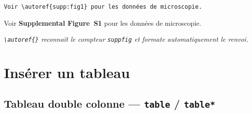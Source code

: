 \documentclass[12pt, a4paper]{article}
\begin{document}
\begin{demo}
\begin{lstlisting}[style=latexcode]
% Dans le corps du texte :
Voir \autoref{supp:fig1} pour les données de microscopie.
\end{lstlisting}
\tcblower
{\footnotesize Voir \textcolor{ENSorange}{\textbf{Supplemental Figure~S1}} pour les données de microscopie.\medskip

\textit{\texttt{\textbackslash autoref\{\}} reconnaît le compteur \texttt{suppfig} et formate automatiquement le renvoi.}}
\end{demo}

\newpage

\section{Insérer un tableau}

\subsection{Tableau double colonne — \texttt{table} / \texttt{table*}}
\end{document}

